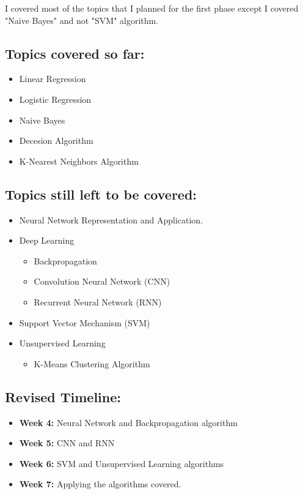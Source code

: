 I covered most of the topics that I planned for the first phase except I covered "Naive Bayes" and not "SVM" algorithm.

\subsection*{Topics covered so far:}
	\begin{itemize}
		\item Linear Regression
		\item Logistic Regression
		\item Naive Bayes
		\item Decesion Algorithm
		\item K-Nearest Neighbors Algorithm
	\end{itemize}

\subsection*{Topics still left to be covered:}
	\begin{itemize}
		\item Neural Network Representation and Application.
		\item Deep Learning
		\begin{itemize}
			\item Backpropagation
			\item Convolution Neural Network (CNN)
			\item Recurrent Neural Network (RNN)
		\end{itemize}
		\item Support Vector Mechanism (SVM)
		\item Unsupervised Learning
		\begin{itemize}
			\item K-Means Clustering Algorithm 
		\end{itemize}
	\end{itemize}

\subsection*{Revised Timeline:}
	\begin{itemize}
		\item \textbf{Week 4:} Neural Network and Backpropagation algorithm
		\item \textbf{Week 5:} CNN and RNN
		\item \textbf{Week 6:} SVM and Unsupervised Learning algorithms
		\item \textbf{Week 7:} Applying the algorithms covered.
	\end{itemize}

